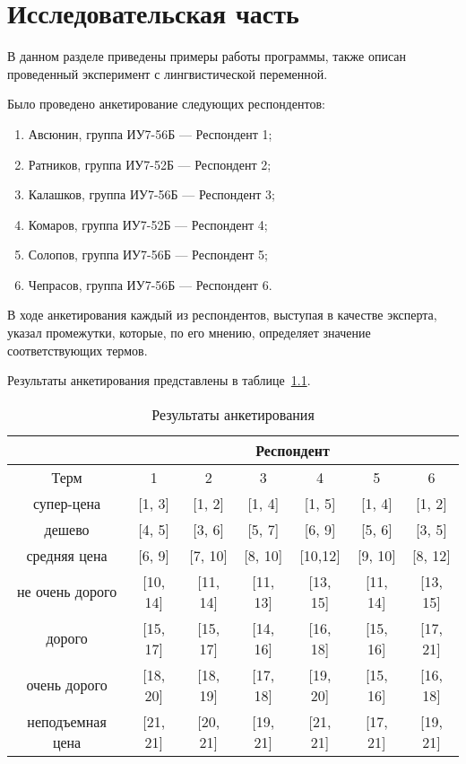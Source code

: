 \chapter{Исследовательская часть}
В данном разделе приведены примеры работы программы, также описан проведенный эксперимент с лингвистической переменной.


Было проведено анкетирование следующих респондентов:
\begin{enumerate}
	\item Авсюнин, группа ИУ7-56Б --- Респондент 1;
	\item Ратников, группа ИУ7-52Б --- Респондент 2;
	\item Калашков, группа ИУ7-56Б --- Респондент 3;
	\item Комаров, группа ИУ7-52Б --- Респондент 4;
	\item Солопов, группа ИУ7-56Б --- Респондент 5;
	\item Чепрасов, группа ИУ7-56Б --- Респондент 6.
\end{enumerate}

В ходе анкетирования каждый из респондентов, выступая в качестве эксперта, указал промежутки, которые, по его мнению, определяет значение соответствующих термов.

Результаты анкетирования представлены в таблице~\ref{anket}. 

\begin{table}[h!]
	\begin{center}
		\begin{threeparttable}
			\captionsetup{justification=raggedright,singlelinecheck=off}
			\caption{Результаты анкетирования}
			\label{anket}
			\begin{tabular}{|c|c|c|c|c|c|c|}
				\hline
				& \multicolumn{6}{c|}{Респондент} \\
				\hline
				Терм & 1 & 2 & 3 & 4 & 5 & 6 \\
				\hline
				супер-цена &[1, 3]&[1, 2]&[1, 4]&[1, 5]&[1, 4]&[1, 2] \\
				\hline
				дешево & [4, 5] &  [3, 6] &[5, 7]&[6, 9]&[5, 6]&[3, 5] \\
				\hline
				средняя цена &[6, 9]&[7, 10]&[8, 10]&[10,12]&[9, 10]&[8, 12] \\
				\hline		
				не очень дорого &[10, 14]&[11, 14]&[11, 13]&[13, 15]&[11, 14]&[13, 15] \\
				\hline		
				дорого &[15, 17]&[15, 17]&[14, 16]&[16, 18]&[15, 16]&[17, 21] \\
				\hline		
				очень дорого &[18, 20]&[18, 19]&[17, 18]&[19, 20]&[15, 16]&[16, 18] \\
				\hline		
				неподъемная цена &  [21, 21] &[20, 21] &[19, 21]&[21, 21]&[17, 21]&[19, 21] \\
				\hline
			\end{tabular}
		\end{threeparttable}	
	\end{center}
\end{table}


